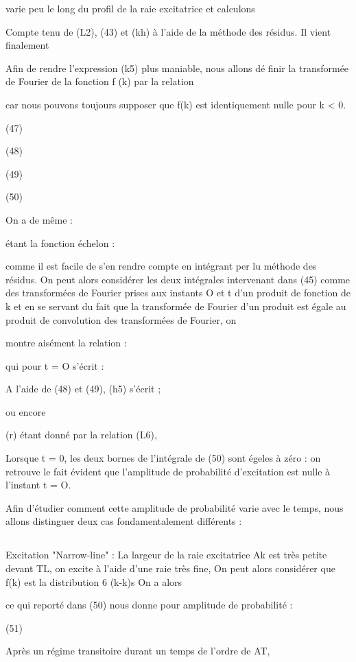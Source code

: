 varie peu le long du profil de la raie excitatrice et calculons

 Compte tenu de (L2), (43) et (kh) à l'aide de la méthode
des résidus. Il vient finalement

Afin de rendre l'expression (k5) plus maniable, nous allons dé
finir la transformée de Fourier de la fonction f (k) par la relation

car nous pouvons toujours supposer que f(k) est identiquement nulle pour k < 0.

(47)

(48)

(49)

(50)

On a de même :

 étant la fonction échelon : 

comme il est facile de s'en rendre compte en intégrant per lu méthode des
résidus. On peut alors considérer les deux intégrales intervenant dans (45)
comme des transformées de Fourier prises aux instants O et t d'un produit de
fonction de k et en se servant du fait que la transformée de Fourier d'un
produit est égale au produit de convolution des transformées de Fourier, on

montre aisément la relation :

qui pour t = O s'écrit :

A l'aide de (48) et (49), (h5) s'écrit ;

ou encore

(r) étant donné par la relation (L6),


Lorsque t = 0, les deux bornes de l'intégrale de (50) sont
égeles à zéro : on retrouve le fait évident que l'amplitude de probabilité
d'excitation est nulle à l'instant t = O.

Afin d'étudier comment cette amplitude de probabilité varie
avec le temps, nous allons distinguer deux cas fondamentalement différents :
\subsection{} Excitation "Narrow-line" :%
La largeur de la raie excitatrice Ak est très
petite devant TL,  on excite à l'aide d'une raie très fine, On peut alors
considérer que f(k) est la distribution 6 (k-k)s On a alors

ce qui reporté dans (50) nous donne pour amplitude de probabilité :

(51)

Après un régime transitoire durant un temps de l'ordre de AT,


